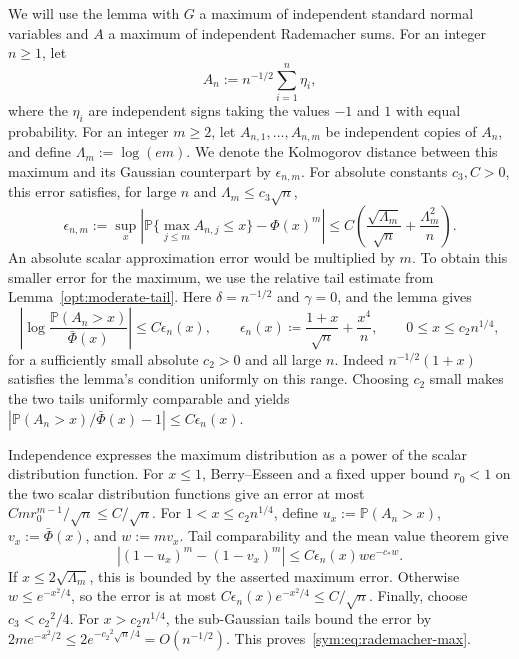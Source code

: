 \documentclass[11pt,letterpaper]{article}
\newenvironment{recovered}{}{}
\theoremstyle{remark}
\newcommand{\Pp}{\mathbb P}
\begin{document}
We will use the lemma with \(G\) a maximum of independent standard
normal variables and \(A\) a maximum of independent Rademacher sums.
{For an integer \(n\ge1\), let}
\[
 A_n:=n^{-1/2}\sum_{i=1}^n\eta_i,
\]
where the \(\eta_i\) are independent signs taking the values
\(-1\) and \(1\) with equal probability. {For an integer \(m\ge2\), let}
\(A_{n,1},\ldots,A_{n,m}\) be independent copies of \(A_n\), and {define}
\(\Lambda_m:=\log(em)\).
\begin{recovered}
We denote the Kolmogorov distance between this maximum and its
Gaussian counterpart by \(\epsilon_{n,m}\). For absolute constants
\({c_3},C>0\), this error satisfies, for large \(n\) and
\(\Lambda_m\le {c_3}\sqrt n\),
\end{recovered}
\begin{equation}
 \epsilon_{n,m}:=\sup_x\left|\Pp\{\max_{j\le m}A_{n,j}\le x\}-\Phi(x)^m\right|
 \le C\left(\frac{\sqrt{\Lambda_m}}{\sqrt n}
                 +\frac{\Lambda_m^2}{n}\right).
 \label{sym:eq:rademacher-max}
\end{equation}
An absolute scalar approximation error would be multiplied by \(m\).
To obtain this smaller error for the maximum, we use the relative
tail estimate from Lemma~\ref{opt:moderate-tail}. Here
\(\delta=n^{-1/2}\) and \(\gamma=0\), and the lemma gives
\[
 \left|\log\frac{\Pp(A_n>x)}{\bar\Phi(x)}\right|
 \le C\epsilon_n(x),\qquad
 \epsilon_n(x)\coloneqq\frac{1+x}{\sqrt n}+\frac{x^4}{n},
 \qquad 0\le x\le {c_2}n^{1/4},
\]
for a sufficiently small absolute \({c_2}>0\) and all large \(n\).
Indeed \(n^{-1/2}(1+x)\) satisfies the lemma's condition uniformly
on this range. Choosing \({c_2}\) small makes the two tails uniformly
comparable and yields
\(\left|\Pp(A_n>x)/\bar\Phi(x)-1\right|\le C\epsilon_n(x)\).

Independence expresses the maximum distribution as a power of the
scalar distribution function. For \(x\le1\),
Berry--Esseen and a fixed upper bound \(r_0<1\) on the two scalar
distribution functions give an error at most
\(Cm r_0^{m-1}/\sqrt n\le C/\sqrt n\). For
\(1<x\le {c_2}n^{1/4}\), {define} \(u_x:=\Pp(A_n>x)\),
\(v_x:=\bar\Phi(x)\), and \(w:=mv_x\).
Tail comparability and the mean value theorem give
\[
 |(1-u_x)^m-(1-v_x)^m|\le C\epsilon_n(x)w e^{-c_*w}.
\]
If \(x\le2\sqrt{\Lambda_m}\), this is bounded by the asserted
maximum error. Otherwise \(w\le e^{-x^2/4}\), so the error is
at most \(C\epsilon_n(x)e^{-x^2/4}\le C/\sqrt n\).
Finally, choose \({c_3}<{c_2}^2/4\). For \(x>{c_2}n^{1/4}\), the
sub-Gaussian tails bound the error by
\(2m e^{-x^2/2}\le2e^{-{c_2}^2\sqrt n/4}=O(n^{-1/2})\).
This proves~\eqref{sym:eq:rademacher-max}.
\end{document}
